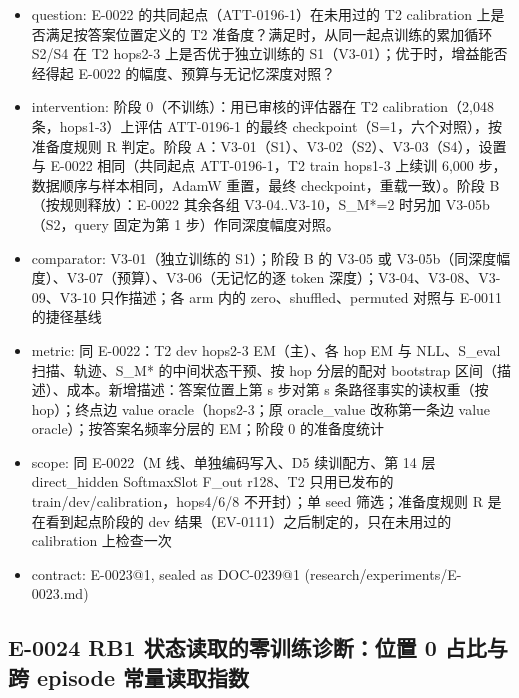 \documentclass[11pt]{article}
\begin{document}
\begin{itemize}
\item question: E-0022 的共同起点（ATT-0196-1）在未用过的 T2 calibration 上是否满足按答案位置定义的 T2 准备度？满足时，从同一起点训练的累加循环 S2/S4 在 T2 hops2-3 上是否优于独立训练的 S1（V3-01）；优于时，增益能否经得起 E-0022 的幅度、预算与无记忆深度对照？
\item intervention: 阶段 0（不训练）：用已审核的评估器在 T2 calibration（2,048 条，hops1-3）上评估 ATT-0196-1 的最终 checkpoint（S=1，六个对照），按准备度规则 R 判定。阶段 A：V3-01（S1）、V3-02（S2）、V3-03（S4），设置与 E-0022 相同（共同起点 ATT-0196-1，T2 train hops1-3 上续训 6,000 步，数据顺序与样本相同，AdamW 重置，最终 checkpoint，重载一致）。阶段 B（按规则释放）：E-0022 其余各组 V3-04..V3-10，S\_M*=2 时另加 V3-05b（S2，query 固定为第 1 步）作同深度幅度对照。
\item comparator: V3-01（独立训练的 S1）；阶段 B 的 V3-05 或 V3-05b（同深度幅度）、V3-07（预算）、V3-06（无记忆的逐 token 深度）；V3-04、V3-08、V3-09、V3-10 只作描述；各 arm 内的 zero、shuffled、permuted 对照与 E-0011 的捷径基线
\item metric: 同 E-0022：T2 dev hops2-3 EM（主）、各 hop EM 与 NLL、S\_eval 扫描、轨迹、S\_M* 的中间状态干预、按 hop 分层的配对 bootstrap 区间（描述）、成本。新增描述：答案位置上第 s 步对第 s 条路径事实的读权重（按 hop）；终点边 value oracle（hops2-3；原 oracle\_value 改称第一条边 value oracle）；按答案名频率分层的 EM；阶段 0 的准备度统计
\item scope: 同 E-0022（M 线、单独编码写入、D5 续训配方、第 14 层 direct\_hidden SoftmaxSlot F\_out r128、T2 只用已发布的 train/dev/calibration，hops4/6/8 不开封）；单 seed 筛选；准备度规则 R 是在看到起点阶段的 dev 结果（EV-0111）之后制定的，只在未用过的 calibration 上检查一次
\item contract: E-0023@1, sealed as DOC-0239@1 (research/experiments/E-0023.md)
\end{itemize}

\subsection*{E-0024 RB1 状态读取的零训练诊断：位置 0 占比与跨 episode 常量读取指数}
\end{document}
